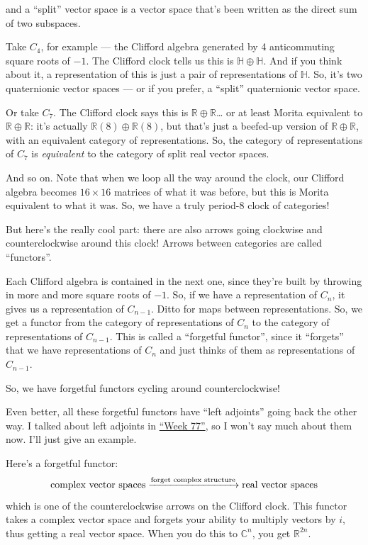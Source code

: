 \documentclass{article}
\begin{document}
and a ``split'' vector space is a vector space that's been written as
the direct sum of two subspaces.

Take \(C_4\), for example --- the Clifford algebra generated by 4
anticommuting square roots of \(-1\). The Clifford clock tells us this
is \(\mathbb{H}\oplus\mathbb{H}\). And if you think about it, a
representation of this is just a pair of representations of
\(\mathbb{H}\). So, it's two quaternionic vector spaces --- or if you
prefer, a ``split'' quaternionic vector space.

Or take \(C_7\). The Clifford clock says this is
\(\mathbb{R}\oplus\mathbb{R}\)\ldots{} or at least Morita equivalent to
\(\mathbb{R}\oplus\mathbb{R}\): it's actually
\(\mathbb{R}(8)\oplus\mathbb{R}(8)\), but that's just a beefed-up
version of \(\mathbb{R}\oplus\mathbb{R}\), with an equivalent category
of representations. So, the category of representations of \(C_7\) is
\emph{equivalent} to the category of split real vector spaces.

And so on. Note that when we loop all the way around the clock, our
Clifford algebra becomes \(16\times16\) matrices of what it was before,
but this is Morita equivalent to what it was. So, we have a truly
period-8 clock of categories!

But here's the really cool part: there are also arrows going clockwise
and counterclockwise around this clock! Arrows between categories are
called ``functors''.

Each Clifford algebra is contained in the next one, since they're built
by throwing in more and more square roots of \(-1\). So, if we have a
representation of \(C_n\), it gives us a representation of \(C_{n-1}\).
Ditto for maps between representations. So, we get a functor from the
category of representations of \(C_n\) to the category of
representations of \(C_{n-1}\). This is called a ``forgetful functor'',
since it ``forgets'' that we have representations of \(C_n\) and just
thinks of them as representations of \(C_{n-1}\).

So, we have forgetful functors cycling around counterclockwise!

Even better, all these forgetful functors have ``left adjoints'' going
back the other way. I talked about left adjoints in
\protect\hyperlink{week77}{``Week 77''}, so I won't say much about them
now. I'll just give an example.

Here's a forgetful functor:
\[\mbox{complex vector spaces}\xrightarrow{\mbox{\scriptsize forget complex structure}}\mbox{real vector spaces}\]
which is one of the counterclockwise arrows on the Clifford clock. This
functor takes a complex vector space and forgets your ability to
multiply vectors by \(i\), thus getting a real vector space. When you do
this to \(\mathbb{C}^n\), you get \(\mathbb{R}^{2n}\).
\end{document}
